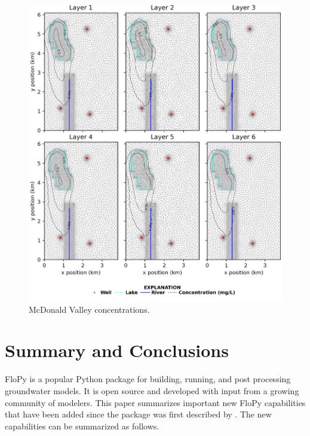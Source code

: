 \documentclass[11pt, oneside]{article}   	%
\begin{document}
\begin{figure}[ht!]
	\begin{center}
		\includegraphics{figures/mv_voronoi_map_concentration.png}
	\end{center}
	\caption{McDonald Valley concentrations.}
	\label{fig:mvxsection}
\end{figure}


\section{Summary and Conclusions}
FloPy is a popular Python package for building, running, and post processing groundwater models.  It is open source and developed with input from a growing community of modelers.  This paper summarizes important new FloPy capabilities that have been added since the package was first described by \citep{bakker2016scripting}.  The new capabilities can be summarized as follows.
\end{document}
